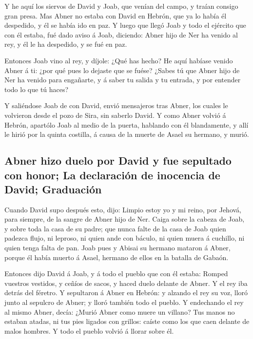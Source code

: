  Y he aquí los siervos de David y Joab, que venían del
campo, y traían consigo gran presa. Mas Abner no estaba con David en
Hebrón, que ya lo había él despedido, y él se había ido en paz.
 Y luego que llegó Joab y todo el ejército que con él
estaba, fué dado aviso á Joab, diciendo: Abner hijo de Ner ha venido al
rey, y él le ha despedido, y se fué en paz.

 Entonces Joab vino al rey, y díjole: ¿Qué has hecho? He
aquí habíase venido Abner á ti: ¿por qué pues lo dejaste que se fuése?
 ¿Sabes tú que Abner hijo de Ner ha venido para engañarte,
y á saber tu salida y tu entrada, y por entender todo lo que tú haces?

 Y saliéndose Joab de con David, envió mensajeros tras
Abner, los cuales le volvieron desde el pozo de Sira, sin saberlo David.
 Y como Abner volvió á Hebrón, apartólo Joab al medio de la
puerta, hablando con él blandamente, y allí le hirió por la quinta
costilla, á causa de la muerte de Asael su hermano, y murió.

\hypertarget{abner-hizo-duelo-por-david-y-fue-sepultado-con-honor-la-declaraciuxf3n-de-inocencia-de-david-graduaciuxf3n}{%
\subsection{Abner hizo duelo por David y fue sepultado con honor; La
declaración de inocencia de David;
Graduación}\label{abner-hizo-duelo-por-david-y-fue-sepultado-con-honor-la-declaraciuxf3n-de-inocencia-de-david-graduaciuxf3n}}

 Cuando David supo después esto, dijo: Limpio estoy yo y mi
reino, por Jehová, para siempre, de la sangre de Abner hijo de Ner.
 Caiga sobre la cabeza de Joab, y sobre toda la casa de su
padre; que nunca falte de la casa de Joab quien padezca flujo, ni
leproso, ni quien ande con báculo, ni quien muera á cuchillo, ni quien
tenga falta de pan.  Joab pues y Abisai su hermano mataron
á Abner, porque él había muerto á Asael, hermano de ellos en la batalla
de Gabaón.

 Entonces dijo David á Joab, y á todo el pueblo que con él
estaba: Romped vuestros vestidos, y ceñíos de sacos, y haced duelo
delante de Abner. Y el rey iba detrás del féretro.  Y
sepultaron á Abner en Hebrón: y alzando el rey su voz, lloró junto al
sepulcro de Abner; y lloró también todo el pueblo.  Y
endechando el rey al mismo Abner, decía: ¿Murió Abner como muere un
villano?  Tus manos no estaban atadas, ni tus pies ligados
con grillos: caíste como los que caen delante de malos hombres. Y todo
el pueblo volvió á llorar sobre él.

